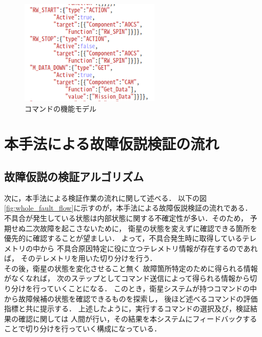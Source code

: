 \documentclass[11pt]{jsreport}
\begin{document}
\begin{figure}[H]
   \centering
      \includegraphics[height=5.0cm]{figure/COM_type.png}
      \caption{コマンドの機能モデル}
      \label{fig:COM_type}
\end{figure}

\newpage
\section{本手法による故障仮説検証の流れ}
\subsection{故障仮説の検証アルゴリズム}
次に，本手法による検証作業の流れに関して述べる．
以下の図\ref{fig:whole_fault_flow}に示すのが，本手法による故障仮説検証の流れである．\\
不具合が発生している状態は内部状態に関する不確定性が多い．そのため，
予期せぬ二次故障を起こさないために，
衛星の状態を変えずに確認できる箇所を優先的に確認することが望ましい．
よって，不具合発生時に取得しているテレメトリの中から
不具合原因特定に役に立つテレメトリ情報が存在するのであれば，
そのテレメトリを用いた切り分けを行う．\\
その後，衛星の状態を変化させること無く
故障箇所特定のために得られる情報がなくなれば，
次のステップとしてコマンド送信によって得られる情報から切り分けを行っていくことになる．
このとき，衛星システムが持つコマンドの中から故障候補の状態を確認できるものを探索し，
後ほど述べるコマンドの評価指標と共に提示する．
上述したように，実行するコマンドの選択及び，検証結果の確認に関しては
人間が行い，その結果を本システムにフィードバックすることで切り分けを行っていく構成になっている．
\end{document}
